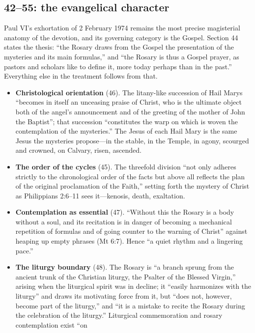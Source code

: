 \subsection{ 42--55: the evangelical character}

Paul VI's exhortation of 2 February 1974 remains the most precise
magisterial anatomy of the devotion, and its governing category is the
Gospel. Section 44 states the thesis: ``the Rosary draws from the Gospel
the presentation of the mysteries and its main formulas,'' and ``the
Rosary is thus a Gospel prayer, as pastors and scholars like to define
it, more today perhaps than in the past.'' Everything else in the
treatment follows from that.

\begin{itemize}
\item \textbf{Christological orientation} (46). The litany-like
succession of Hail Marys ``becomes in itself an unceasing praise of
Christ, who is the ultimate object both of the angel's announcement and
of the greeting of the mother of John the Baptist''; that succession
``constitutes the warp on which is woven the contemplation of the
mysteries.'' The Jesus of each Hail Mary is the same Jesus the mysteries
propose---in the stable, in the Temple, in agony, scourged and crowned,
on Calvary, risen, ascended.
\item \textbf{The order of the cycles} (45). The threefold division
``not only adheres strictly to the chronological order of the facts but
above all reflects the plan of the original proclamation of the Faith,''
setting forth the mystery of Christ as Philippians 2:6--11 sees
it---kenosis, death, exaltation.
\item \textbf{Contemplation as essential} (47). ``Without this the
Rosary is a body without a soul, and its recitation is in danger of
becoming a mechanical repetition of formulas and of going counter to the
warning of Christ'' against heaping up empty phrases (Mt 6:7). Hence
``a quiet rhythm and a lingering pace.''
\item \textbf{The liturgy boundary} (48). The Rosary is ``a branch
sprung from the ancient trunk of the Christian liturgy, the Psalter of
the Blessed Virgin,'' arising when the liturgical spirit was in decline;
it ``easily harmonizes with the liturgy'' and draws its motivating force
from it, but ``does not, however, become part of the liturgy,'' and ``it
is a mistake to recite the Rosary during the celebration of the
liturgy.'' Liturgical commemoration and rosary contemplation exist ``on

\end{itemize}
